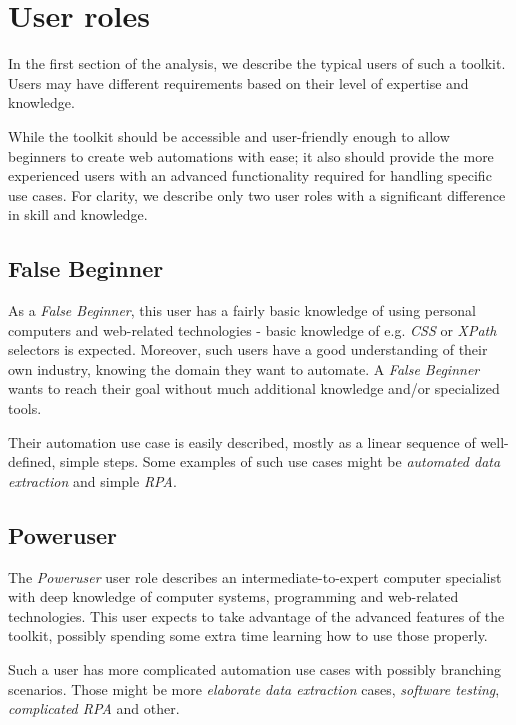 \section{User roles} \label{userroles}

In the first section of the analysis, we describe the typical users of such a toolkit.
Users may have different requirements based on their level of expertise and knowledge.

While the toolkit should be accessible and user-friendly enough to allow beginners to
create web automations with ease; it also should provide the more experienced users with 
an advanced functionality required for handling specific use cases. 
For clarity, we describe only two user roles with a significant difference in skill and knowledge. 

\subsection{False Beginner}
As a \textit{False Beginner}, this user has a fairly basic knowledge of using personal computers 
and web-related technologies - basic knowledge of e.g. \textit{CSS} or \textit{XPath} selectors is expected.
Moreover, such users have a good understanding of their own industry, knowing the domain they want to automate.
A \textit{False Beginner} wants to reach their goal without much additional knowledge and/or specialized tools.

Their automation use case is easily described, mostly as a linear sequence of well-defined, simple steps.
Some examples of such use cases might be \textit{automated data extraction} and simple \textit{\acl{RPA}}.


\subsection{Poweruser}
The \textit{Poweruser} user role describes an intermediate-to-expert computer specialist with deep
knowledge of computer systems, programming and web-related technologies.
This user expects to take advantage of the advanced features of the toolkit, possibly spending some extra time learning how to use those properly.

Such a user has more complicated automation use cases with possibly branching scenarios. 
Those might be more \textit{elaborate data extraction} cases, \textit{software testing}, \textit{complicated \ac{RPA}} and other.
